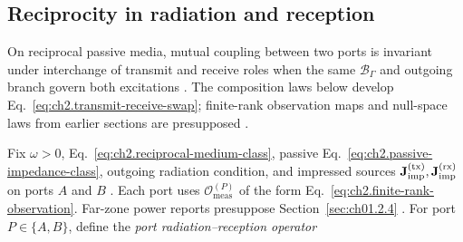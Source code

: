 \subsection{Reciprocity in radiation and reception}
\label{sec:ch283}

On reciprocal passive media, mutual coupling between two ports is invariant under interchange of
transmit and receive roles when the same $\mathcal{B}_\Gamma$ and outgoing branch govern both
excitations \cite{stratton1941,collin2001}. The composition laws below develop
Eq.~\eqref{eq:ch2.transmit-receive-swap}; finite-rank observation maps and null-space laws from
earlier sections are presupposed \cite{stratton1941}.

Fix $\omega>0$, Eq.~\eqref{eq:ch2.reciprocal-medium-class}, passive
Eq.~\eqref{eq:ch2.passive-impedance-class}, outgoing radiation condition, and impressed sources
$\mathbf{J}_{\mathrm{imp}}^{\mathrm{(tx)}},\mathbf{J}_{\mathrm{imp}}^{\mathrm{(rx)}}$ on ports $A$ and $B$ \cite{stratton1941}. Each port
uses $\mathcal{O}_{\mathrm{meas}}^{(P)}$ of the form Eq.~\eqref{eq:ch2.finite-rank-observation}.
Far-zone power reports presuppose Section~\ref{sec:ch01.2.4} \cite{harrington2001}.
For port \(P\in\{A,B\}\), define the \emph{port radiation--reception operator}

